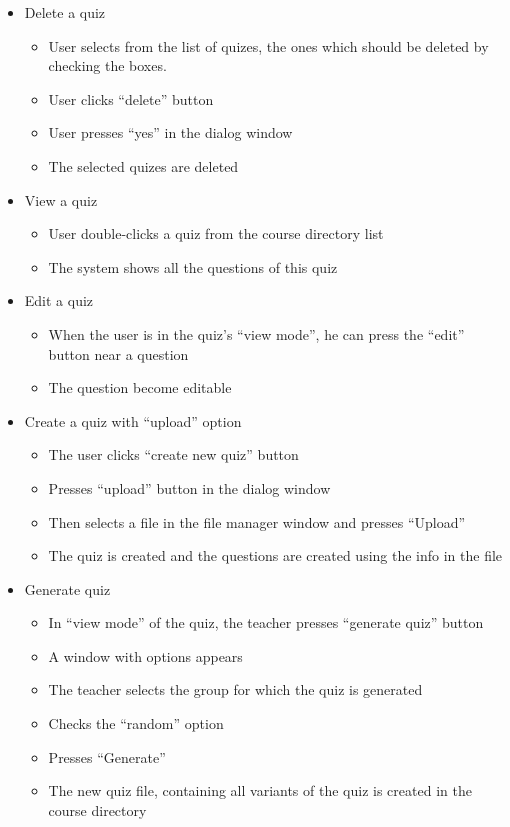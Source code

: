 \begin{itemize}
  \item Delete a quiz
  \begin{itemize}
    \item User selects from the list of quizes, the ones which should be deleted by checking the boxes.
    \item User clicks “delete” button
    \item User presses “yes” in the dialog window
    \item The selected quizes are deleted
  \end{itemize}    

  \item View a quiz
  \begin{itemize}
    \item User double-clicks a quiz from the course directory list
    \item The system shows all the questions of this quiz
  \end{itemize}    

  \item Edit a quiz
  \begin{itemize}
    \item When the user is in the quiz’s “view mode”, he can press the “edit” button near a question
    \item The question become editable
  \end{itemize}    

  \item Create a quiz with “upload” option
  \begin{itemize}
    \item The user clicks “create new quiz” button
    \item Presses “upload” button in the dialog window
    \item Then selects a file in the file manager window and presses “Upload”
    \item The quiz is created and the questions are created using the info in the file
  \end{itemize}

  \item Generate quiz
  \begin{itemize}
    \item In “view mode” of the quiz, the teacher presses “generate quiz” button
    \item A window with options appears
    \item The teacher selects the group for which the quiz is generated
    \item Checks the “random” option
    \item Presses “Generate”
    \item The new quiz file, containing all variants of the quiz is created in the course directory
  \end{itemize}


\end{itemize}
